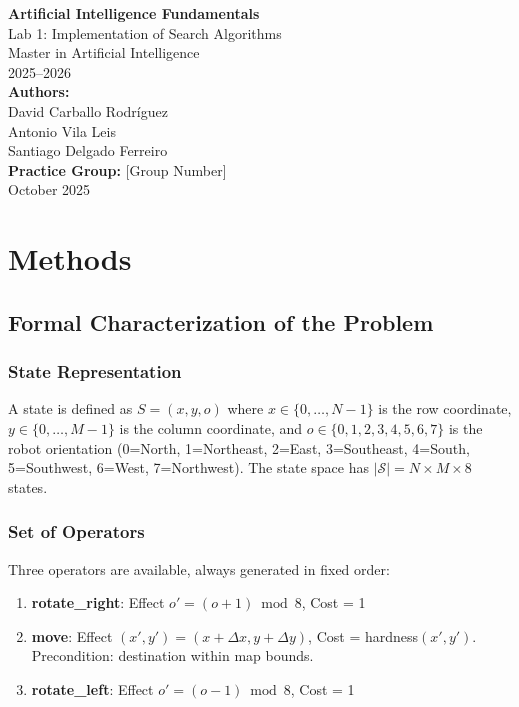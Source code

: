 \documentclass[11pt,a4paper]{article}
\begin{document}
\begin{titlepage}
    \centering
    \vspace*{2cm}
    {\LARGE\textbf{Artificial Intelligence Fundamentals}}\\[0.5cm]
    {\Large Lab 1: Implementation of Search Algorithms}\\[1.5cm]
    {\large Master in Artificial Intelligence}\\[0.3cm]
    {\large 2025--2026}\\[2cm]
    
    {\large\textbf{Authors:}}\\[0.3cm]
    {\large David Carballo Rodríguez}\\[0.2cm]
    {\large Antonio Vila Leis}\\[0.2cm]
    {\large Santiago Delgado Ferreiro}\\[1.5cm]
    
    {\large\textbf{Practice Group:} [Group Number]}\\[1.5cm]
    \vfill
    {\large October 2025}
\end{titlepage}

\tableofcontents
\newpage

\section{Methods}

\subsection{Formal Characterization of the Problem}

\subsubsection{State Representation}
A state is defined as $S = (x, y, o)$ where $x \in \{0, \ldots, N-1\}$ is the row coordinate, $y \in \{0, \ldots, M-1\}$ is the column coordinate, and $o \in \{0, 1, 2, 3, 4, 5, 6, 7\}$ is the robot orientation (0=North, 1=Northeast, 2=East, 3=Southeast, 4=South, 5=Southwest, 6=West, 7=Northwest). The state space has $|\mathcal{S}| = N \times M \times 8$ states.

\subsubsection{Set of Operators}
Three operators are available, always generated in fixed order:
\begin{enumerate}[itemsep=0.2em]
    \item \textbf{rotate\_right}: Effect $o' = (o + 1) \bmod 8$, Cost = 1
    \item \textbf{move}: Effect $(x', y') = (x + \Delta x, y + \Delta y)$, Cost = hardness$(x', y')$. Precondition: destination within map bounds.
    \item \textbf{rotate\_left}: Effect $o' = (o - 1) \bmod 8$, Cost = 1
\end{enumerate}
\end{document}

